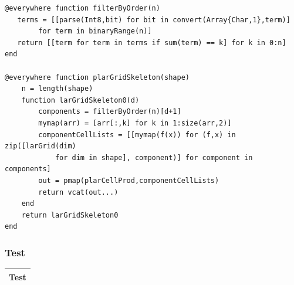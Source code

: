 \documentclass{article}
\begin{document}
\begin{flushleft}
\begin{list}{}{}
\begin{Verbatim}[tabsize=4]
@everywhere function filterByOrder(n)
   terms = [[parse(Int8,bit) for bit in convert(Array{Char,1},term)]
		for term in binaryRange(n)]
   return [[term for term in terms if sum(term) == k] for k in 0:n]
end

@everywhere function plarGridSkeleton(shape)
    n = length(shape)
    function larGridSkeleton0(d)
        components = filterByOrder(n)[d+1]
        mymap(arr) = [arr[:,k] for k in 1:size(arr,2)]
        componentCellLists = [[mymap(f(x)) for (f,x) in zip([larGrid(dim) 
			for dim in shape], component)] for component in components]
		out = pmap(plarCellProd,componentCellLists)
        return vcat(out...)
    end
    return larGridSkeleton0
end   
   \end{Verbatim}
\end{list}
\footnotesize\addtolength{\baselineskip}{-1ex}
\end{flushleft}
\vspace{2ex}

\subsubsection{Test}
\begin{center}
\begin{tabular}{|p{16cm}|}
\hline
\cellcolor[gray]{.9}Test\\
\hline
\end{tabular}
\end{center}
\end{document}
